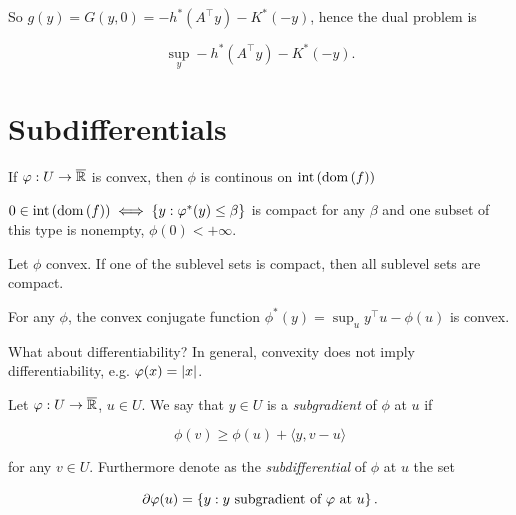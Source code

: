 So $g(y) = G(y,0) = -h^*(A^\top y) - K^*(-y)$, hence the dual problem is 

\[ \sup_y -h^*(A^\top y) -K^*(-y). \]

\section{Subdifferentials}

\begin{recall}

    If $\varphi : U \to \overline{\mathbb{R}}$ is convex, then $\phi$ is continous on $\mathrm{int}\left({\mathrm{dom}\left(f\right)}\right)$

\end{recall}

\begin{recall}

    $0 \in \mathrm{int}\left(\mathrm{dom}\left(f\right)\right) \iff \left\{ y : \varphi^*(y) \le \beta \right\}$ is compact for any $\beta$ and one subset of this type is nonempty, $\phi(0) < +\infty$.

\end{recall}

\begin{recall}

    Let $\phi$ convex. If one of the sublevel sets is compact, then all sublevel sets are compact.

\end{recall}

\begin{recall}

    For any $\phi$, the convex conjugate function $\phi^*(y) = \sup_u y^\top u - \phi(u)$ is convex.

\end{recall}

What about differentiability? In general, convexity does not imply differentiability, e.g. $\varphi(x) = \left|x\right|$.

\begin{definition}

    Let $\varphi : U \to \overline{\mathbb{R}}$, $u \in U$. We say that $y \in U$ is a \emph{subgradient} of $\phi$ at $u$ if 

    \[ \phi(v) \ge \phi(u) + \langle y, v-u \rangle \]

    for any $v \in U$. Furthermore denote as the \emph{subdifferential} of $\phi$ at $u$ the set  

    \[ \partial \varphi(u) = \left\{ y : y \text{ subgradient of } \varphi \text{ at } u \right\}. \]
    
\end{definition}

